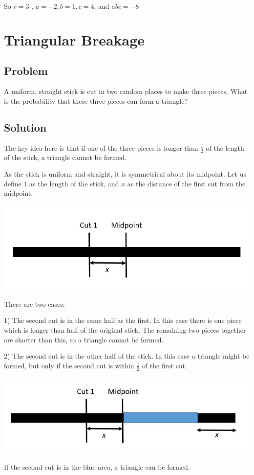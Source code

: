 \documentclass{book}
\begin{document}
So \(r=3\) , \(a=-2,b=1,c=4\), and \(\boxed{abc=-8}\)

\newpage

\section{Triangular Breakage}

\subsection{Problem}
A uniform, straight stick is cut in two random places to make three pieces. What is the probability that these three pieces can form a triangle?

\subsection{Solution}
The key idea here is that if one of the three pieces is longer than \(\frac{1}{2}\) of the length of the stick, a triangle cannot be formed.

As the stick is uniform and straight, it is symmetrical about its midpoint. Let us define \(1\) as the length of the stick, and \(x\) as the distance of the first cut from the midpoint.
\begin{center}
\includegraphics{stick2}
\end{center}
There are two cases:

1) The second cut is in the same half as the first. In this case there is one piece which is longer than half of the original stick. The remaining two pieces together are shorter than this, so a triangle cannot be formed.

2) The second cut is in the other half of the stick. In this case a triangle might be formed, but only if the second cut is within \(\frac{1}{2}\) of the first cut.

\begin{center}
\includegraphics{stick3}
\end{center}
If the second cut is in the blue area, a triangle can be formed.
\end{document}
